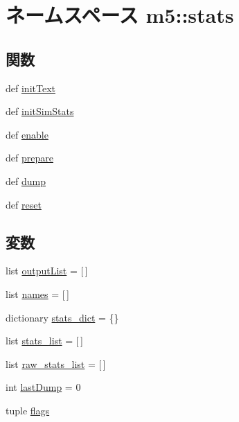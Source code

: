 \hypertarget{namespacem5_1_1stats}{
\section{ネームスペース m5::stats}
\label{namespacem5_1_1stats}
}
\subsection*{関数}
\begin{DoxyCompactItemize}
\item 
def \hyperlink{namespacem5_1_1stats_a31642248b580dfb85a72a918738e3fb1}{initText}
\item 
def \hyperlink{namespacem5_1_1stats_a5d626524a9640c1019937a3e1994e370}{initSimStats}
\item 
def \hyperlink{namespacem5_1_1stats_a315834bd39080d3e697f308f478779ef}{enable}
\item 
def \hyperlink{namespacem5_1_1stats_a437ead66c0abee290697da2855e4af6b}{prepare}
\item 
def \hyperlink{namespacem5_1_1stats_a4ce2e68e958246a7a6d90428f663a6ef}{dump}
\item 
def \hyperlink{namespacem5_1_1stats_a6a83187ec43594ae46577dc5b44d3242}{reset}
\end{DoxyCompactItemize}
\subsection*{変数}
\begin{DoxyCompactItemize}
\item 
list \hyperlink{namespacem5_1_1stats_a1cb3fc67d245c8981c09d7690290d8ae}{outputList} = \mbox{[}$\,$\mbox{]}
\item 
list \hyperlink{namespacem5_1_1stats_a31c1745e8384111d62933080372a6861}{names} = \mbox{[}$\,$\mbox{]}
\item 
dictionary \hyperlink{namespacem5_1_1stats_a95d2ac3ff82f1511e17e2ebf662a766c}{stats\_\-dict} = \{\}
\item 
list \hyperlink{namespacem5_1_1stats_a6d45e9e0fc7637bc0d25181cff8cfe14}{stats\_\-list} = \mbox{[}$\,$\mbox{]}
\item 
list \hyperlink{namespacem5_1_1stats_a171a8d9605eaa8eaa190ac8942d74def}{raw\_\-stats\_\-list} = \mbox{[}$\,$\mbox{]}
\item 
int \hyperlink{namespacem5_1_1stats_a20e8a16c034e351837c23b9da8238d12}{lastDump} = 0
\item 
tuple \hyperlink{namespacem5_1_1stats_a9ceb38153d5c0f156fbeada6dc00ff4f}{flags}
\end{DoxyCompactItemize}


